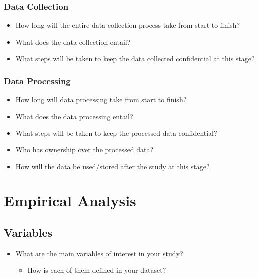\documentclass[
  letterpaper,
  DIV=11,
  numbers=noendperiod]{scrartcl}
\providecommand{\tightlist}{%
  \setlength{\itemsep}{0pt}\setlength{\parskip}{0pt}}\usepackage{longtable,booktabs,array}
\begin{document}
\subsubsection{Data Collection}\label{data-collection}

\begin{itemize}
\tightlist
\item
  How long will the entire data collection process take from start to
  finish?
\item
  What does the data collection entail?
\item
  What steps will be taken to keep the data collected confidential at
  this stage?
\end{itemize}

\subsubsection{Data Processing}\label{data-processing}

\begin{itemize}
\tightlist
\item
  How long will data processing take from start to finish?
\item
  What does the data processing entail?
\item
  What steps will be taken to keep the processed data confidential?
\item
  Who has ownership over the processed data?
\item
  How will the data be used/stored after the study at this stage?
\end{itemize}

\section{Empirical Analysis}\label{empirical-analysis}

\subsection{Variables}\label{variables}

\begin{itemize}
\tightlist
\item
  What are the main variables of interest in your study?

  \begin{itemize}
  \tightlist
  \item
    How is each of them defined in your dataset?
  \end{itemize}
\end{itemize}
\end{document}
